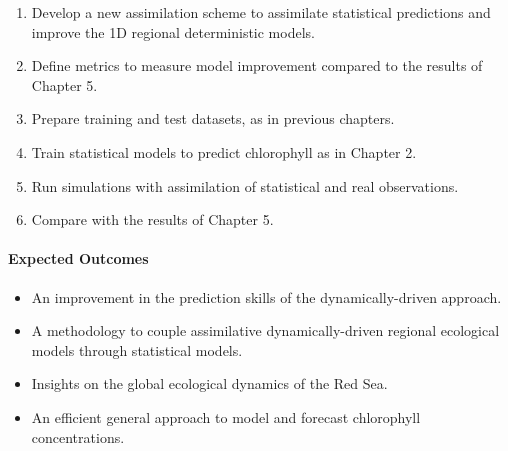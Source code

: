 \begin{enumerate}

\item Develop a new assimilation scheme to assimilate statistical predictions
and improve the 1D regional deterministic models.

\item Define metrics to measure model improvement compared to the results of Chapter
5.

\item Prepare training and test datasets, as in previous chapters.

\item Train statistical models to predict chlorophyll as in Chapter 2.

\item Run simulations with assimilation of statistical and real observations.

\item Compare with the results of Chapter 5.

\end{enumerate}

\paragraph{Expected Outcomes}

\begin{itemize}

\item An improvement in the prediction skills of the dynamically-driven
approach.

\item A methodology to couple assimilative dynamically-driven regional
ecological models through statistical models.

\item Insights on the global ecological dynamics of the Red Sea.

\item An efficient general approach to model and forecast chlorophyll
concentrations.

\end{itemize}
